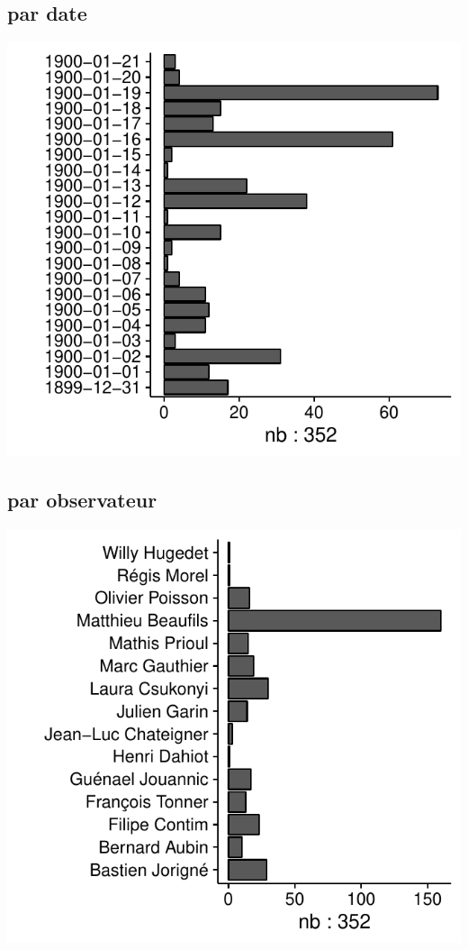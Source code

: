 \subsection*{par date}
\includegraphics[width=\malargeurgraphique]{images/faune_stat_champ_d.pdf}
\subsection*{par observateur}
\includegraphics[width=\malargeurgraphique]{images/faune_stat_champ_observateur.pdf}
